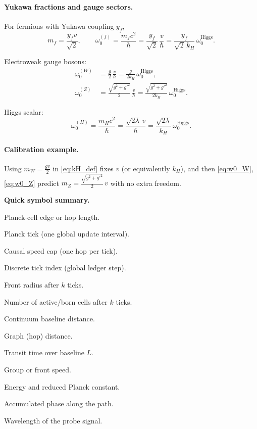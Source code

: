 \paragraph{Yukawa fractions and gauge sectors.}
For fermions with Yukawa coupling \(y_f\),
\begin{equation}
  m_f = \frac{y_f v}{\sqrt{2}}, \qquad
  \omega_0^{(f)} = \frac{m_f c^2}{\hbar}
                 = \frac{y_f}{\sqrt{2}}\,\frac{v}{\hbar}
                 = \frac{y_f}{\sqrt{2}\,k_H}\,\omega_0^{\mathrm{Higgs}}.
  \label{eq:w0_fermion}
\end{equation}

Electroweak gauge bosons:
\begin{align}
  \omega_0^{(W)} &= \frac{g}{2}\,\frac{v}{\hbar}
                  = \frac{g}{2k_H}\,\omega_0^{\mathrm{Higgs}}, \label{eq:w0_W}\\[4pt]
  \omega_0^{(Z)} &= \frac{\sqrt{g^2+g'^2}}{2}\,\frac{v}{\hbar}
                  = \frac{\sqrt{g^2+g'^2}}{2k_H}\,\omega_0^{\mathrm{Higgs}}. \label{eq:w0_Z}
\end{align}

Higgs scalar:
\begin{equation}
  \omega_0^{(H)} = \frac{m_H c^2}{\hbar}
                 = \frac{\sqrt{2\lambda}\,v}{\hbar}
                 = \frac{\sqrt{2\lambda}}{k_H}\,\omega_0^{\mathrm{Higgs}}.
  \label{eq:w0_H}
\end{equation}

\paragraph{Calibration example.}
Using \(m_W = \tfrac{g v}{2}\) in \eqref{eq:kH_def} fixes \(v\) (or equivalently \(k_H\)),
and then \eqref{eq:w0_W}, \eqref{eq:w0_Z} predict \(m_Z = \tfrac{\sqrt{g^2+g'^2}}{2}\,v\) with no extra freedom.

\bigskip
\noindent\textbf{Quick symbol summary.}
\begin{description}[leftmargin=2.4em,labelsep=0.8em]
  \item[\(\ell_P\)] Planck-cell edge or hop length.
  \item[\(t_P\)] Planck tick (one global update interval).
  \item[\(c=\ell_P/t_P\)] Causal speed cap (one hop per tick).
  \item[\(k\)] Discrete tick index (global ledger step).
  \item[\(R(k)\)] Front radius after \(k\) ticks.
  \item[\(N(k)\)] Number of active/born cells after \(k\) ticks.
  \item[\(L\)] Continuum baseline distance.
  \item[\(d_G\)] Graph (hop) distance.
  \item[\(T(L)\)] Transit time over baseline \(L\).
  \item[\(v_g\)] Group or front speed.
  \item[\(E,\,\hbar\)] Energy and reduced Planck constant.
  \item[\(\Delta\phi\)] Accumulated phase along the path.
  \item[\(\lambda\)] Wavelength of the probe signal.
\end{description}
